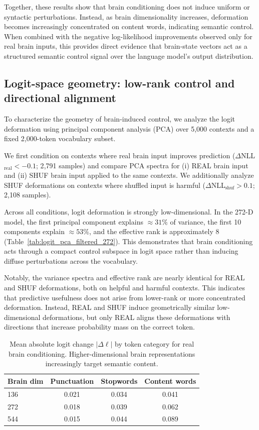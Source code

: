 \documentclass{article}
\theoremstyle{plain}
\theoremstyle{definition}
\theoremstyle{remark}
\begin{document}
Together, these results show that brain conditioning does not induce uniform or syntactic perturbations.
Instead, as brain dimensionality increases, deformation becomes increasingly concentrated on content words, indicating semantic control.
When combined with the negative log-likelihood improvements observed only for real brain inputs, this provides direct evidence that brain-state vectors act as a structured semantic control signal over the language model's output distribution.



\subsection{Logit-space geometry: low-rank control and directional alignment}

To characterize the geometry of brain-induced control, we analyze the logit deformation using principal component analysis (PCA) over 5{,}000 contexts and a fixed 2{,}000-token vocabulary subset.

We first condition on contexts where real brain input improves prediction ($\Delta$NLL$_{\text{real}} < -0.1$; 2{,}791 samples) and compare PCA spectra for (i) REAL brain input and (ii) SHUF brain input applied to the same contexts. We additionally analyze SHUF deformations on contexts where shuffled input is harmful ($\Delta$NLL$_{\text{shuf}} > 0.1$; 2{,}108 samples).




Across all conditions, logit deformation is strongly low-dimensional. In the 272-D model, the first principal component explains $\approx 31\%$ of variance, the first 10 components explain $\approx 53\%$, and the effective rank is approximately $8$ (Table~\ref{tab:logit_pca_filtered_272}). This demonstrates that brain conditioning acts through a compact control subspace in logit space rather than inducing diffuse perturbations across the vocabulary.

Notably, the variance spectra and effective rank are nearly identical for REAL and SHUF deformations, both on helpful and harmful contexts. This indicates that predictive usefulness does not arise from lower-rank or more concentrated deformation. Instead, REAL and SHUF induce geometrically similar low-dimensional deformations, but only REAL aligns these deformations with directions that increase probability mass on the correct token.


\begin{table}[t]
\centering
\caption{Mean absolute logit change $|\Delta \ell|$ by token category for real brain conditioning.
Higher-dimensional brain representations increasingly target semantic content.}
\label{tab:token_sensitivity_dims}
\begin{tabular}{lccc}
\toprule
Brain dim & Punctuation & Stopwords & Content words \\
\midrule
136 & 0.021 & 0.034 & 0.041 \\
272 & 0.018 & 0.039 & 0.062 \\
544 & 0.015 & 0.044 & 0.089 \\
\bottomrule
\end{tabular}
\end{table}
\end{document}
